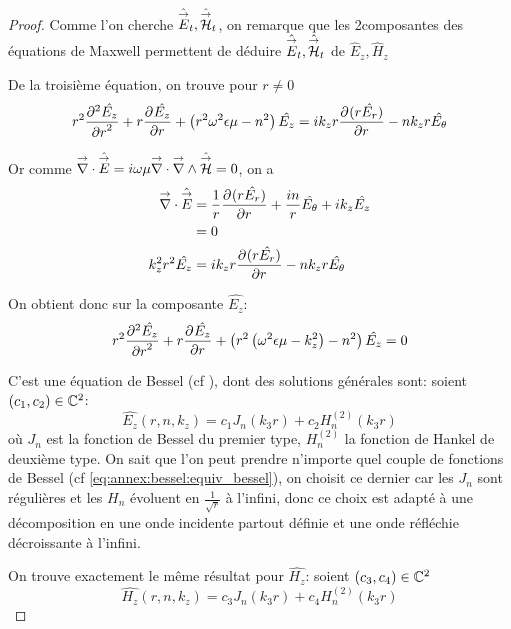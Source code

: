 \begin{proof}
        Comme l'on cherche $\hat \vE_t, \hat \vH_t$, on remarque que les 2\ieme composantes des équations de Maxwell permettent de déduire $\hat\vE_t, \hat\vH_t$ de $ \hat E_z, \hat H_z$

        De la troisième  équation, on trouve pour $r\not=0$
        \begin{equation}
        r^2 \ddr[2]{r}{\hat{E_z}} + r\ddr{r}{\hat{E_z}} + \left(r^2\w^2\eps\mu - n^2\right)\hat{E_z} =ik_zr\ddr{r}{(r\hat{E_r})} -  nk_zr\hat{E_\theta}
        \end{equation}

        Or comme $\vdiv \hat \vE = i\w\mu\vdiv\vrot \hat \vH = 0$, on a
        \begin{align}
            \vdiv\hat \vE &= \frac{1}{r}\ddr{r}{(r\hat{E_r})} + \frac{in}{r}\hat{E_\theta} + ik_z\hat{E_z}
            \\
            &=0
            \\
            k_z^2r^2 \hat{E_z} &= ik_zr\ddr{r}{(r\hat{E_r})} - nk_zr\hat{E_\theta}
        \end{align}

        On obtient donc sur la composante $\hat{E_z}$:
        \begin{equation}
            r^2 \ddr[2]{r}{\hat{E_z}} + r\ddr{r}{\hat{E_z}} + \left(r^2\left(\w^2\eps\mu - k_z^2\right) - n^2\right)\hat{E_z} = 0
        \end{equation}

        C'est une équation de Bessel (cf \cite[eq (6.80)]{bowman_introduction_1958}), dont des solutions générales sont: soient $(c_1,c_2) \in \CC^2$:
       \begin{equation}
            \hat{E_z}(r,n,k_z) = c_1 J_n\left(k_3r\right) + c_2 H_n^{(2)}\left(k_3r\right)
        \end{equation}
        où $J_n$ est la fonction de Bessel du premier type, $H_n^{(2)}$ la fonction de Hankel de deuxième type. On sait que l'on peut prendre n'importe quel couple de fonctions de Bessel (cf \eqref{eq:annex:bessel:equiv_bessel}), on choisit ce dernier car les $J_n$ sont régulières et les $H_n$ évoluent en $\frac{1}{\sqrt{r}}$ à l'infini, donc ce choix est adapté à une décomposition en une onde incidente partout définie et une onde réfléchie décroissante à l'infini.

        On trouve exactement le même résultat pour $\hat{H_z}$: soient $(c_3,c_4) \in \CC^2$
        \begin{equation}
            \hat{H_z}(r,n,k_z) = c_3 J_n\left(k_3r\right) + c_4 H_n^{(2)}\left(k_3r\right)
        \end{equation}
    \end{proof}

